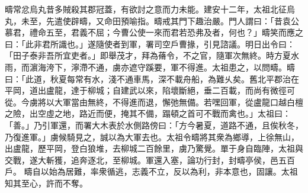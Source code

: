 \begin{pinyinscope}
 
疇常忿烏丸昔多賊殺其郡冠蓋，有欲討之意而力未能。建安十二年，太祖北征烏丸，未至，先遣使辟疇，又命田預喻指。疇戒其門下趣治嚴。門人謂曰：「昔袁公慕君，禮命五至，君義不屈；今曹公使一來而君若恐弗及者，何也？」疇笑而應之曰：「此非君所識也。」遂隨使者到軍，署司空戶曹掾，引見諮議。明日出令曰：「田子泰非吾所宜吏者。」即舉茂才，拜為蓨令，不之官，隨軍次無終。時方夏水雨，而濵海洿下，濘滯不通，虜亦遮守蹊要，軍不得進。太祖患之，以問疇。疇曰：「此道，秋夏每常有水，淺不通車馬，深不載舟船，為難乆矣。舊北平郡治在平岡，道出盧龍，達于柳城；自建武以來，陷壞斷絕，垂二百載，而尚有微徑可從。今虜將以大軍當由無終，不得進而退，懈弛無備。若嘿回軍，從盧龍口越白檀之險，出空虛之地，路近而便，掩其不備，蹋頓之首可不戰而禽也。」太祖曰：「善。」乃引軍還，而署大木表於水側路傍曰：「方今暑夏，道路不通，且俟秋冬，乃復進軍。」虜候騎見之，誠以為大軍去也。太祖令疇將其衆為鄉導，上徐無山，出盧龍，歷平岡，登白狼堆，去柳城二百餘里，虜乃驚覺。單于身自臨陣，太祖與交戰，遂大斬獲，追奔逐北，至柳城。軍還入塞，論功行封，封疇亭侯，邑五百戶。
 疇自以始為居難，率衆循逃，志義不立，反以為利，非本意也，固讓。太祖知其至心，許而不奪。
 

\end{pinyinscope}
